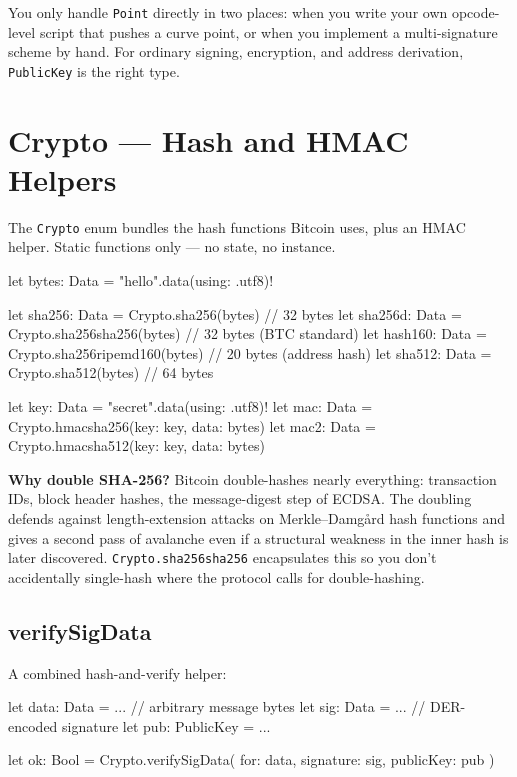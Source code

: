 \documentclass[a4paper, 11pt, openany]{book}
\begin{document}
You only handle \texttt{Point} directly in two places: when you write your own opcode-level script that pushes a curve point, or when you implement a multi-signature scheme by hand. For ordinary signing, encryption, and address derivation, \texttt{PublicKey} is the right type.

\section{Crypto --- Hash and HMAC Helpers}

The \texttt{Crypto} enum bundles the hash functions Bitcoin uses, plus an HMAC helper. Static functions only --- no state, no instance.

\begin{forthbox}
let bytes: Data = "hello".data(using: .utf8)!

let sha256: Data    = Crypto.sha256(bytes)              // 32 bytes
let sha256d: Data   = Crypto.sha256sha256(bytes)        // 32 bytes (BTC standard)
let hash160: Data   = Crypto.sha256ripemd160(bytes)     // 20 bytes (address hash)
let sha512: Data    = Crypto.sha512(bytes)              // 64 bytes

let key: Data = "secret".data(using: .utf8)!
let mac: Data = Crypto.hmacsha256(key: key, data: bytes)
let mac2: Data = Crypto.hmacsha512(key: key, data: bytes)
\end{forthbox}

\begin{notebox}
\textbf{Why double SHA-256?} Bitcoin double-hashes nearly everything: transaction IDs, block header hashes, the message-digest step of ECDSA. The doubling defends against length-extension attacks on Merkle--Damg\aa{}rd hash functions and gives a second pass of avalanche even if a structural weakness in the inner hash is later discovered. \texttt{Crypto.sha256sha256} encapsulates this so you don't accidentally single-hash where the protocol calls for double-hashing.
\end{notebox}

\subsection{verifySigData}

A combined hash-and-verify helper:

\begin{forthbox}
let data: Data = ...                  // arbitrary message bytes
let sig: Data = ...                   // DER-encoded signature
let pub: PublicKey = ...

let ok: Bool = Crypto.verifySigData(
    for: data,
    signature: sig,
    publicKey: pub
)
\end{forthbox}
\end{document}

